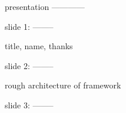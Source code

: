 presentation
------------

slide 1:
--------

title, name, thanks


%




slide 2:
--------

rough architecture of framework





slide 3:
--------

